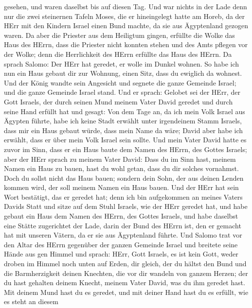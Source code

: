 gesehen, und waren daselbst bis auf diesen Tag.  Und war
nichts in der Lade denn nur die zwei steinernen Tafeln Moses, die er
hineingelegt hatte am Horeb, da der HErr mit den Kindern Israel einen
Bund machte, da sie aus Ägyptenland gezogen waren.  Da aber
die Priester aus dem Heiligtum gingen, erfüllte die Wolke das Haus des
HErrn,  dass die Priester nicht konnten stehen und des Amts
pflegen vor der Wolke; denn die Herrlichkeit des HErrn erfüllte das Haus
des HErrn.  Da sprach Salomo: Der HErr hat geredet, er
wolle im Dunkel wohnen.  So habe ich nun ein Haus gebaut
dir zur Wohnung, einen Sitz, dass du ewiglich da wohnest. 
Und der König wandte sein Angesicht und segnete die ganze Gemeinde
Israel; und die ganze Gemeinde Israel stand.  Und er
sprach: Gelobet sei der HErr, der Gott Israels, der durch seinen Mund
meinem Vater David geredet und durch seine Hand erfüllt hat und gesagt:
 Von dem Tage an, da ich mein Volk Israel aus Ägypten
führte, habe ich keine Stadt erwählt unter irgendeinem Stamm Israels,
dass mir ein Haus gebaut würde, dass mein Name da wäre; David aber habe
ich erwählt, dass er über mein Volk Israel sein sollte. 
Und mein Vater David hatte es zuvor im Sinn, dass er ein Haus baute dem
Namen des HErrn, des Gottes Israels;  aber der HErr sprach
zu meinem Vater David: Dass du im Sinn hast, meinem Namen ein Haus zu
bauen, hast du wohl getan, dass du dir solches vornahmst. 
Doch du sollst nicht das Haus bauen; sondern dein Sohn, der aus deinen
Lenden kommen wird, der soll meinem Namen ein Haus bauen. 
Und der HErr hat sein Wort bestätigt, das er geredet hat; denn ich bin
aufgekommen an meines Vaters Davids Statt und sitze auf dem Stuhl
Israels, wie der HErr geredet hat, und habe gebaut ein Haus dem Namen
des HErrn, des Gottes Israels,  und habe daselbst eine
Stätte zugerichtet der Lade, darin der Bund des HErrn ist, den er
gemacht hat mit unseren Vätern, da er sie aus Ägyptenland führte.
 Und Salomo trat vor den Altar des HErrn gegenüber der
ganzen Gemeinde Israel und breitete seine Hände aus gen Himmel
 und sprach: HErr, Gott Israels, es ist kein Gott, weder
droben im Himmel noch unten auf Erden, dir gleich, der du hältst den
Bund und die Barmherzigkeit deinen Knechten, die vor dir wandeln von
ganzem Herzen;  der du hast gehalten deinem Knecht, meinem
Vater David, was du ihm geredet hast. Mit deinem Mund hast du es
geredet, und mit deiner Hand hast du es erfüllt, wie es steht an diesem
